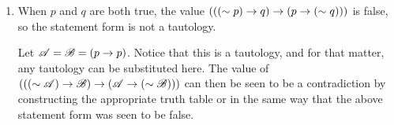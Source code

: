 \begin{enumerate}
  \item %
    When \(p\) and \(q\) are both true, the value \((((\sim p) \rightarrow q) \rightarrow (p \rightarrow (\sim q)))\) is false, so the statement form is not a tautology.

    Let \(\mathscr{A} = \mathscr{B} = (p \rightarrow p)\). Notice that this is a tautology, and for that matter, any tautology can be substituted here. The value of \((((\sim \mathscr{A}) \rightarrow \mathscr{B}) \rightarrow (\mathscr{A} \rightarrow (\sim \mathscr{B})))\) can then be seen to be a contradiction by constructing the appropriate truth table or in the same way that the above statement form was seen to be false.
\end{enumerate}
